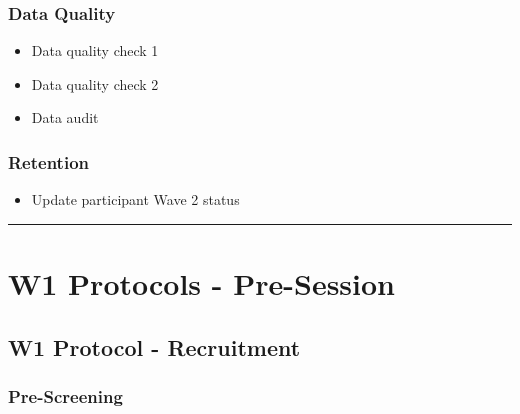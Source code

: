 \documentclass[
]{book}
\providecommand{\tightlist}{%
  \setlength{\itemsep}{0pt}\setlength{\parskip}{0pt}}
\begin{document}
\hypertarget{data-quality}{%
\subsubsection{Data Quality}\label{data-quality}}

\begin{itemize}
\tightlist
\item
  Data quality check 1
\item
  Data quality check 2
\item
  Data audit
\end{itemize}

\hypertarget{retention}{%
\subsubsection{Retention}\label{retention}}

\begin{itemize}
\tightlist
\item
  Update participant Wave 2 status
\end{itemize}

\begin{center}\rule{0.5\linewidth}{0.5pt}\end{center}

\hypertarget{w1-protocols---pre-session}{%
\section{W1 Protocols - Pre-Session}\label{w1-protocols---pre-session}}

\hypertarget{w1-protocol---recruitment}{%
\subsection{W1 Protocol - Recruitment}\label{w1-protocol---recruitment}}

\hypertarget{pre-screening}{%
\subsubsection{Pre-Screening}\label{pre-screening}}
\end{document}
